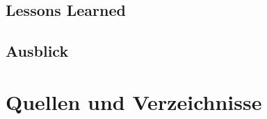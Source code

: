\documentclass[11pt]{article} %
\begin{document}
\subsection{Lessons Learned}
\subsection{Ausblick}


\newpage
\section{Quellen und Verzeichnisse}


\newpage
\listoffigures
{}
\newpage
\listoftables
{}

\newpage
\pagestyle{headings}
\appendix
\setcounter{figure}{0}
\setcounter{table}{0}
\renewcommand{\thefigure}{A\arabic{figure}}
\renewcommand{\thetable}{A\arabic{table}}
\renewcommand{\thesubsection}{A\arabic{subsection}}


\end{document}

